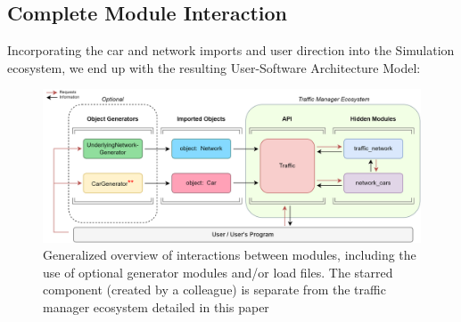 \subsection{Complete Module Interaction}

\par Incorporating the car and network imports and user direction into the Simulation ecosystem, we end up with the resulting User-Software Architecture Model:

\begin{figure}[H]
    \centering
	\includegraphics[width=\textwidth]{tex files/Figures/Revised_FullEcosystemArchitecture.png}
	\caption[User-Software Interaction]{Generalized overview of interactions between modules, including the use of optional generator modules and/or load files.  The starred component (created by a colleague) is separate from the traffic manager ecosystem detailed in this paper}
	\label{fig:modules_all}
\end{figure}
